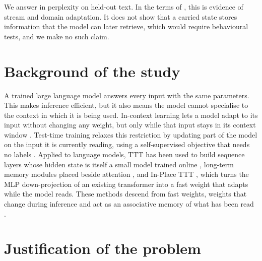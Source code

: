 \documentclass[12pt,a4paper]{report}
\begin{document}
We answer in perplexity on held-out text. In the terms of \citet{song2026beyond}, this is evidence of stream and domain adaptation. It does not show that a carried state stores information that the model can later retrieve, which would require behavioural tests, and we make no such claim.

\section{Background of the study}

A trained large language model answers every input with the same parameters. This makes inference efficient, but it also means the model cannot specialise to the context in which it is being used. In-context learning lets a model adapt to its input without changing any weight, but only while that input stays in its context window \citep{brown2020language,dong2024survey}. Test-time training relaxes this restriction by updating part of the model on the input it is currently reading, using a self-supervised objective that needs no labels \citep{sun2020ttt}. Applied to language models, TTT has been used to build sequence layers whose hidden state is itself a small model trained online \citep{sun2025learning}, long-term memory modules placed beside attention \citep{behrouz2025titans}, and In-Place TTT \citep{feng2026inplace}, which turns the MLP down-projection of an existing transformer into a fast weight that adapts while the model reads. These methods descend from fast weights, weights that change during inference and act as an associative memory of what has been read \citep{ba2016using,schlag2021linear}.

\section{Justification of the problem}
\end{document}
